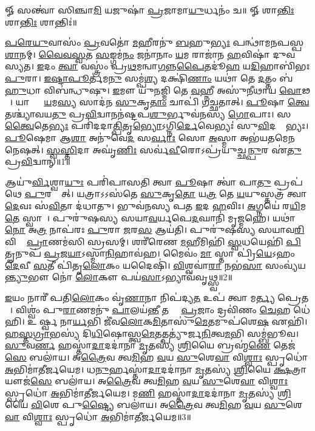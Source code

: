 \setcounter{anuvakam}{0}
𑍐 𑌸𑌨𑍍𑌤𑍍𑌵𑌾॑ 𑌸𑌿𑌞𑍍𑌚𑌾\ul{𑌮𑌿} 𑌯𑌜𑍁𑌷𑌾॑ \ul{𑌪𑍍𑌰}𑌜𑌾𑌮𑌾\ul{𑌯𑍁}𑌰𑍍𑌧𑌨𑌂॑ 𑌚॥ 𑍐 𑌶𑌾\ul{𑌨𑍍𑌤𑌿𑌃} 𑌶𑌾\ul{𑌨𑍍𑌤𑌿𑌃} 𑌶𑌾𑌨𑍍𑌤𑌿𑌃॑॥

\ul{𑌪}\ul{𑌰𑍇}\ul{𑌯𑍁}𑌵𑌾𑌸𑌂॑ \ul{𑌪𑍍𑌰}𑌵𑌤𑍋॑ \ul{𑌮}𑌹𑍀𑌰𑌨𑍁॑ \ul{𑌬}𑌹𑍁\ul{𑌭𑍍𑌯𑌃} 𑌪𑌨𑍍𑌥𑌾॑𑌮𑌨𑌪𑌸𑍍𑌪\ul{𑌶𑌾}𑌨𑌮𑍍। 
\ul{𑌵𑍈}\ul{𑌵}\ul{𑌸𑍍𑌵}𑌤 \ul{𑌸}𑌙𑍍𑌗𑌮॑\ul{𑌨𑌂} 𑌜𑌨𑌾॑𑌨𑌾𑌂 \ul{𑌯}𑌮 𑌰𑌾𑌜𑌾॑𑌨 \ul{𑌹}𑌵𑌿𑌷𑌾॑ 𑌦𑍁𑌵𑌸𑍍𑌯𑌤। 
\ul{𑌇}𑌦𑌂 \ul{𑌤𑍍𑌵𑌾} 𑌵𑌸𑍍𑌤𑍍𑌰𑌂॑ 𑌪𑍍𑌰\ul{𑌥}𑌮𑌨𑍍𑌵𑌾\ul{𑌗}𑌨𑍍𑌨\ul{𑌪𑍈}𑌤𑌦𑍂॑\ul{𑌹} 𑌯\ul{𑌦𑌿}𑌹𑌾𑌬𑌿॑𑌭𑌃 \ul{𑌪𑍁}𑌰𑌾। 
\ul{𑌇}\ul{𑌷𑍍𑌟𑌾}\ul{𑌪𑍂}𑌰𑍍𑌤𑌮\ul{𑌨𑍁} 𑌸𑌮𑍍𑌪॑\ul{𑌶𑍍𑌯} 𑌦𑌕𑍍𑌷𑌿॑\ul{𑌣𑌾𑌂} 𑌯𑌥𑌾॑ 𑌤𑍇 \ul{𑌦}𑌤𑍍𑌤𑌂 𑌬॑\ul{𑌹𑍁}𑌧𑌾 𑌵𑌿𑌬॑𑌨𑍍𑌧𑍁𑌷𑍁। 
\ul{𑌇}𑌮𑍗 𑌯𑍁॑𑌨𑌜𑍍𑌮𑌿 𑌤𑍇 \ul{𑌵}𑌹𑍍𑌨𑍀 𑌅𑌸𑍁॑𑌨𑍀𑌥𑌾𑌯 \ul{𑌵𑍋}𑌢𑌵𑍇᳚। 
𑌯𑌾𑌭𑍍𑌯𑌾𑌂᳚ \ul{𑌯}𑌮\ul{𑌸𑍍𑌯} 𑌸𑌾𑌦॑𑌨 \ul{𑌸𑍁}𑌕𑍃\ul{𑌤𑌾𑌂} 𑌚𑌾𑌪𑌿॑ 𑌗𑌚𑍍𑌛𑌤𑌾𑌤𑍍। 
\ul{𑌪𑍂}𑌷𑌾 \ul{𑌤𑍍𑌵𑍇}𑌤𑌶𑍍𑌚𑍍𑌯𑌾॑𑌵𑌯\ul{𑌤𑍁} 𑌪𑍍𑌰\ul{𑌵𑌿}𑌦𑍍𑌵𑌾𑌨𑌨॑𑌷𑍍𑌟𑌪\ul{𑌶𑍁}𑌰𑍍𑌭𑍁𑌵॑𑌨𑌸𑍍𑌯 \ul{𑌗𑍋}𑌪𑌾𑌃। 
𑌸 \ul{𑌤𑍍𑌵𑍈}𑌤𑍇\ul{𑌭𑍍𑌯𑌃} 𑌪𑌰𑌿॑𑌦𑌦𑌾\ul{𑌤𑍍𑌪𑌿}𑌤𑍃\ul{𑌭𑍍𑌯𑍋}𑌽𑌗𑍍𑌨𑌿\ul{𑌰𑍍𑌦𑍇}𑌵𑍇𑌭𑍍𑌯𑌃॑ 𑌸𑍁\ul{𑌵𑌿}𑌦𑌤𑍍𑌰𑍇᳚𑌭𑍍𑌯𑌃। 
\ul{𑌪𑍂}𑌷𑍇𑌮𑌾 𑌆\ul{𑌶𑌾} 𑌅𑌨𑍁॑𑌵𑍇\ul{𑌦} 𑌸\ul{𑌰𑍍𑌵𑌾𑌃} 𑌸𑍋 \ul{𑌅}𑌸𑍍𑌮𑌾 𑌅𑌭॑𑌯𑌤𑌮𑍇𑌨 𑌨𑍇𑌷𑌤𑍍। 
\ul{𑌸𑍍𑌵}\ul{𑌸𑍍𑌤𑌿}𑌦𑌾 𑌅𑌘𑍃॑\ul{𑌣𑌿𑌃} 𑌸𑌰𑍍𑌵॑\ul{𑌵𑍀}𑌰𑍋𑌽𑌪𑍍𑌰॑𑌯𑍁𑌚𑍍𑌛\ul{𑌨𑍍𑌪𑍁}𑌰 𑌏॑\ul{𑌤𑍁} 𑌪𑍍𑌰\ul{𑌵𑌿}𑌦𑍍𑌵𑌾𑌨𑍍॥1॥

𑌆𑌯𑍁॑\ul{𑌰𑍍𑌵𑌿}𑌶𑍍𑌵𑌾\ul{𑌯𑍁𑌃} 𑌪𑌰𑌿॑𑌪𑌾𑌸𑌤𑌿 𑌤𑍍𑌵𑌾 \ul{𑌪𑍂}𑌷𑌾 𑌤𑍍𑌵𑌾॑ 𑌪𑌾\ul{𑌤𑍁} 𑌪𑍍𑌰𑌪॑𑌥𑍇 \ul{𑌪𑍁}𑌰𑌸𑍍𑌤𑌾᳚𑌤𑍍। 
𑌯𑌤𑍍𑌰𑌾𑌽𑌽𑌸॑𑌤𑍇 \ul{𑌸𑍁}𑌕𑍃\ul{𑌤𑍋} 𑌯\ul{𑌤𑍍𑌰} 𑌤𑍇 \ul{𑌯}𑌯𑍁𑌸𑍍𑌤𑌤𑍍𑌰॑ 𑌤𑍍𑌵𑌾 \ul{𑌦𑍇}𑌵𑌃 𑌸॑\ul{𑌵𑌿}𑌤𑌾 𑌦॑𑌧𑌾𑌤𑍁। 
𑌭𑍁𑌵॑𑌨𑌸𑍍𑌯 𑌪𑌤 \ul{𑌇}𑌦 \ul{𑌹}𑌵𑌿𑌃। 
\ul{𑌅}𑌗𑍍𑌨𑌯𑍇॑ 𑌰\ul{𑌯𑌿}𑌮\ul{𑌤𑍇} 𑌸𑍍𑌵𑌾𑌹𑌾᳚। 
𑌪𑍁𑌰𑍁॑𑌷𑌸𑍍𑌯 𑌸𑌯𑌾\ul{𑌵}𑌰𑍍𑌯𑌪𑍇\ul{𑌦}𑌘𑌾𑌨𑌿॑ 𑌮𑍃𑌜𑍍𑌮𑌹𑍇। 
𑌯𑌥𑌾॑ \ul{𑌨𑍋} 𑌅\ul{𑌤𑍍𑌰} 𑌨𑌾𑌪॑𑌰𑌃 \ul{𑌪𑍁}𑌰𑌾 \ul{𑌜}𑌰\ul{𑌸} 𑌆𑌯॑𑌤𑌿। 
𑌪𑍁𑌰𑍁॑𑌷𑌸𑍍𑌯 𑌸𑌯𑌾𑌵\ul{𑌰𑌿} 𑌵𑌿 𑌤𑍇᳚ \ul{𑌪𑍍𑌰𑌾}𑌣𑌮॑𑌸𑌿 𑌸𑍍𑌰𑌸𑌮𑍍। 
𑌶𑌰𑍀॑𑌰𑍇𑌣 \ul{𑌮}𑌹𑍀𑌮𑌿𑌹𑌿॑ \ul{𑌸𑍍𑌵}𑌧𑌯𑍇𑌹𑌿॑ \ul{𑌪𑌿}𑌤𑍄𑌨𑍁𑌪॑ \ul{𑌪𑍍𑌰}𑌜\ul{𑌯𑌾}𑌽𑌸𑍍𑌮𑌾\ul{𑌨𑌿}𑌹𑌾𑌵॑𑌹। 
𑌮𑍈𑌵𑌂॑ \ul{𑌮𑌾}\ul{} 𑌸𑍍𑌤𑌾 𑌪𑍍𑌰𑌿॑\ul{𑌯𑍇}𑌽𑌹𑌂 \ul{𑌦𑍇}𑌵𑍀 \ul{𑌸}𑌤𑍀 𑌪𑌿॑𑌤𑍃\ul{𑌲𑍋}𑌕𑌂 𑌯𑌦𑍈𑌷𑌿॑। 
\ul{𑌵𑌿}𑌶𑍍𑌵𑌵𑌾॑\ul{𑌰𑌾} 𑌨𑌭॑\ul{𑌸𑌾} 𑌸𑌂𑌵𑍍𑌯॑𑌯\ul{𑌨𑍍𑌤𑍍𑌯𑍁}𑌭𑍗 𑌨𑍋॑ \ul{𑌲𑍋}𑌕𑍗 𑌪𑌯॑\ul{𑌸𑌾}𑌽𑌭𑍍𑌯𑌾𑌵॑𑌵𑍃𑌥𑍍𑌸𑍍𑌵॥2॥

\ul{𑌇}𑌯𑌂 𑌨𑌾𑌰𑍀॑ 𑌪𑌤𑌿\ul{𑌲𑍋}𑌕𑌂 𑌵𑍃॑\ul{𑌣𑌾}𑌨𑌾 𑌨𑌿𑌪॑𑌦𑍍𑌯\ul{𑌤} 𑌉𑌪॑ 𑌤𑍍𑌵𑌾 𑌮\ul{𑌰𑍍𑌤𑍍𑌯} 𑌪𑍍𑌰𑍇𑌤𑌮𑍍᳚। 
𑌵𑌿𑌶𑍍𑌵𑌂॑ 𑌪𑍁\ul{𑌰𑌾}𑌣𑌮𑌨𑍁॑ \ul{𑌪𑌾}𑌲𑌯॑\ul{𑌨𑍍𑌤𑍀} 𑌤𑌸𑍍𑌯𑍈᳚ \ul{𑌪𑍍𑌰}𑌜𑌾𑌂 𑌦𑍍𑌰𑌵𑌿॑𑌣𑌂 \ul{𑌚𑍇}𑌹 𑌧𑍇॑𑌹𑌿। 
𑌉𑌦𑍀᳚𑌰𑍍𑌷𑍍𑌵 𑌨𑌾\ul{𑌰𑍍𑌯}𑌭𑌿 𑌜𑍀॑𑌵\ul{𑌲𑍋}𑌕\ul{𑌮𑌿}𑌤𑌾𑌸𑍁॑\ul{𑌮𑍇}𑌤𑌮𑍁𑌪॑𑌶𑍇\ul{𑌷} 𑌏𑌹𑌿॑। 
\ul{𑌹}\ul{𑌸𑍍𑌤}\ul{𑌗𑍍𑌰𑌾}𑌭𑌸𑍍𑌯॑ 𑌦𑌿\ul{𑌧𑌿}𑌷𑍋𑌸𑍍𑌤𑍍𑌵\ul{𑌮𑍇}𑌤𑌤𑍍𑌪𑌤𑍍𑌯𑍁॑𑌰𑍍𑌜\ul{𑌨𑌿}𑌤𑍍𑌵\ul{𑌮}𑌭𑌿 𑌸𑌮𑍍𑌬॑𑌭𑍂𑌵। 
\ul{𑌸𑍁}𑌵\ul{𑌰𑍍𑌣}\ul{} 𑌹𑌸𑍍𑌤𑌾॑\ul{𑌦𑌾}𑌦𑌦𑌾॑𑌨𑌾 \ul{𑌮𑍃}𑌤𑌸𑍍𑌯॑ \ul{𑌶𑍍𑌰𑌿}𑌯𑍈 𑌬𑍍𑌰𑌹𑍍𑌮॑\ul{𑌣𑍇} 𑌤𑍇𑌜॑\ul{𑌸𑍇} 𑌬𑌲𑌾॑𑌯। 
𑌅\ul{𑌤𑍍𑌰𑍈}𑌵 𑌤𑍍𑌵\ul{𑌮𑌿}𑌹 \ul{𑌵}𑌯 \ul{𑌸𑍁}𑌶𑍇\ul{𑌵𑌾} 𑌵𑌿\ul{𑌶𑍍𑌵𑌾𑌃} 𑌸𑍍𑌪𑍃𑌧𑍋॑ \ul{𑌅}𑌭𑌿𑌮𑌾॑𑌤𑍀𑌰𑍍𑌜𑌯𑍇𑌮। 
𑌧\ul{𑌨𑍁}𑌰𑍍\mbox{}𑌹𑌸𑍍𑌤𑌾॑\ul{𑌦𑌾}𑌦𑌦𑌾॑𑌨𑌾 \ul{𑌮𑍃}𑌤𑌸𑍍𑌯॑ \ul{𑌶𑍍𑌰𑌿}𑌯𑍈 \ul{𑌕𑍍𑌷}𑌤𑍍𑌰𑌾𑌯𑍗𑌜॑\ul{𑌸𑍇} 𑌬𑌲𑌾॑𑌯। 
𑌅\ul{𑌤𑍍𑌰𑍈}𑌵 𑌤𑍍𑌵\ul{𑌮𑌿}𑌹 \ul{𑌵}𑌯 \ul{𑌸𑍁}𑌶𑍇\ul{𑌵𑌾} 𑌵𑌿\ul{𑌶𑍍𑌵𑌾𑌃} 𑌸𑍍𑌪𑍃𑌧𑍋॑ \ul{𑌅}𑌭𑌿𑌮𑌾॑𑌤𑍀𑌰𑍍𑌜𑌯𑍇𑌮। 
𑌮\ul{𑌣𑌿}\ul{} 𑌹𑌸𑍍𑌤𑌾॑\ul{𑌦𑌾}𑌦𑌦𑌾॑𑌨𑌾 \ul{𑌮𑍃}𑌤𑌸𑍍𑌯॑ \ul{𑌶𑍍𑌰𑌿}𑌯𑍈 \ul{𑌵𑌿}𑌶𑍇 𑌪𑍁\ul{𑌷𑍍𑌟𑍍𑌯𑍈} 𑌬𑌲𑌾॑𑌯। 
𑌅\ul{𑌤𑍍𑌰𑍈}𑌵 𑌤𑍍𑌵\ul{𑌮𑌿}𑌹 \ul{𑌵}𑌯 \ul{𑌸𑍁}𑌶𑍇\ul{𑌵𑌾} 𑌵𑌿\ul{𑌶𑍍𑌵𑌾𑌃} 𑌸𑍍𑌪𑍃𑌧𑍋॑ \ul{𑌅}𑌭𑌿𑌮𑌾॑𑌤𑍀𑌰𑍍𑌜𑌯𑍇𑌮॥3॥

